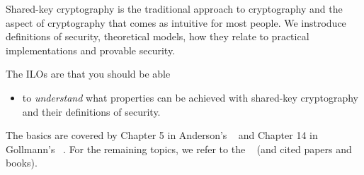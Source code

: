 Shared-key cryptography is the traditional approach to cryptography and the 
aspect of cryptography that comes as intuitive for most people.
We instroduce definitions of security, theoretical models, how they relate to 
practical implementations and provable security.

The \acp{ILO} are that you should be able
\begin{itemize}
  \item to \emph{understand} what properties can be achieved with shared-key 
    cryptography and their definitions of security.
\end{itemize}

The basics are covered by
Chapter 5 in Anderson's ~\cite{Anderson2008sea} and
Chapter 14 in Gollmann's ~\cite{Gollmann2011cs}.
For the remaining topics, we refer to the ~\cite{EOCS} (and 
cited papers and books).
